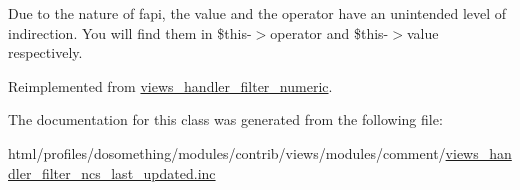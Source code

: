 Due to the nature of fapi, the value and the operator have an unintended level of indirection. You will find them in \$this-\/$>$operator and \$this-\/$>$value respectively. 

Reimplemented from \hyperlink{classviews__handler__filter__numeric_aaa5c6b227651bd1676850f5999f2a897}{views\_\-handler\_\-filter\_\-numeric}.

The documentation for this class was generated from the following file:\begin{DoxyCompactItemize}
\item 
html/profiles/dosomething/modules/contrib/views/modules/comment/\hyperlink{views__handler__filter__ncs__last__updated_8inc}{views\_\-handler\_\-filter\_\-ncs\_\-last\_\-updated.inc}\end{DoxyCompactItemize}
